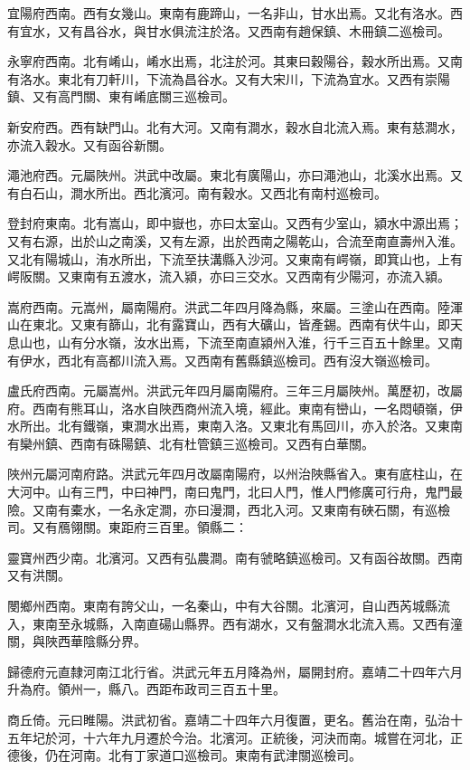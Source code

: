 宜陽府西南。西有女幾山。東南有鹿蹄山，一名非山，甘水出焉。又北有洛水。西有宜水，又有昌谷水，與甘水俱流注於洛。又西南有趙保鎮、木冊鎮二巡檢司。

永寧府西南。北有崤山，崤水出焉，北注於河。其東曰穀陽谷，穀水所出焉。又南有洛水。東北有刀軒川，下流為昌谷水。又有大宋川，下流為宜水。又西有崇陽鎮、又有高門關、東有崤底關三巡檢司。

新安府西。西有缺門山。北有大河。又南有澗水，穀水自北流入焉。東有慈澗水，亦流入穀水。又有函谷新關。

澠池府西。元屬陜州。洪武中改屬。東北有廣陽山，亦曰澠池山，北溪水出焉。又有白石山，澗水所出。西北濱河。南有穀水。又西北有南村巡檢司。

登封府東南。北有嵩山，即中嶽也，亦曰太室山。又西有少室山，潁水中源出焉；又有右源，出於山之南溪，又有左源，出於西南之陽乾山，合流至南直壽州入淮。又北有陽城山，洧水所出，下流至扶溝縣入沙河。又東南有崿嶺，即箕山也，上有崿阪關。又東南有五渡水，流入潁，亦曰三交水。又西南有少陽河，亦流入潁。

嵩府西南。元嵩州，屬南陽府。洪武二年四月降為縣，來屬。三塗山在西南。陸渾山在東北。又東有篩山，北有露寶山，西有大礦山，皆產錫。西南有伏牛山，即天息山也，山有分水嶺，汝水出焉，下流至南直潁州入淮，行千三百五十餘里。又南有伊水，西北有高都川流入焉。又西南有舊縣鎮巡檢司。西有沒大嶺巡檢司。

盧氏府西南。元屬嵩州。洪武元年四月屬南陽府。三年三月屬陜州。萬歷初，改屬府。西南有熊耳山，洛水自陜西商州流入境，經此。東南有巒山，一名悶頓嶺，伊水所出。北有鐵嶺，東澗水出焉，東南入洛。又東北有馬回川，亦入於洛。又東南有欒州鎮、西南有硃陽鎮、北有杜管鎮三巡檢司。又西有白華關。

陜州元屬河南府路。洪武元年四月改屬南陽府，以州治陜縣省入。東有底柱山，在大河中。山有三門，中曰神門，南曰鬼門，北曰人門，惟人門修廣可行舟，鬼門最險。又南有橐水，一名永定澗，亦曰漫澗，西北入河。又東南有硤石關，有巡檢司。又有鴈翎關。東距府三百里。領縣二：

靈寶州西少南。北濱河。又西有弘農澗。南有虢略鎮巡檢司。又有函谷故關。西南又有洪關。

閿鄉州西南。東南有誇父山，一名秦山，中有大谷關。北濱河，自山西芮城縣流入，東南至永城縣，入南直碭山縣界。西有湖水，又有盤澗水北流入焉。又西有潼關，與陜西華陰縣分界。

歸德府元直隸河南江北行省。洪武元年五月降為州，屬開封府。嘉靖二十四年六月升為府。領州一，縣八。西距布政司三百五十里。

商丘倚。元曰睢陽。洪武初省。嘉靖二十四年六月復置，更名。舊治在南，弘治十五年圮於河，十六年九月遷於今治。北濱河。正統後，河決而南。城嘗在河北，正德後，仍在河南。北有丁家道口巡檢司。東南有武津關巡檢司。

